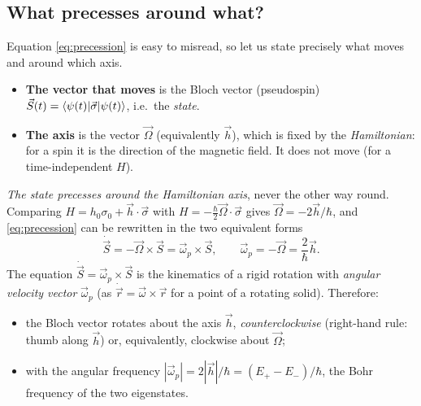 \subsection{What precesses around what?}\label{sec:precession}
Equation \eqref{eq:precession} is easy to misread, so let us state precisely what moves and around which axis.
\begin{itemize}
  \item \textbf{The vector that moves} is the Bloch vector (pseudospin) $\vec S(t)=\left\langle\psi(t)\middle|\vec\sigma\middle|\psi(t)\right\rangle$, i.e.\ the \emph{state}.
  \item \textbf{The axis} is the vector $\vec\Omega$ (equivalently $\vec h$), which is fixed by the \emph{Hamiltonian}: for a spin it is the direction of the
  magnetic field. It does not move (for a time-independent $H$).
\end{itemize}
\emph{The state precesses around the Hamiltonian axis}, never the other way round. Comparing $H=h_0\sigma_0+\vec h\cdot\vec\sigma$ with $H=-\frac\hbar2\vec\Omega\cdot\vec\sigma$
gives $\vec\Omega=-2\vec h/\hbar$, and \cref{eq:precession} can be rewritten in the two equivalent forms
\begin{equation}\label{eq:precession2}
  \dot{\vec S}=-\vec\Omega\times\vec S=\vec\omega_p\times\vec S,\qquad\vec\omega_p=-\vec\Omega=\frac2\hbar\vec h .
\end{equation}
The equation $\dot{\vec S}=\vec\omega_p\times\vec S$ is the kinematics of a rigid rotation with \emph{angular velocity vector} $\vec\omega_p$ (as $\dot{\vec r}=\vec\omega\times\vec r$
for a point of a rotating solid). Therefore:
\begin{itemize}
  \item the Bloch vector rotates about the axis $\vec h$, \emph{counterclockwise} (right-hand rule: thumb along $\vec h$) or, equivalently, clockwise about $\vec\Omega$;
  \item with the angular frequency $|\vec\omega_p|=2|\vec h|/\hbar=(E_+-E_-)/\hbar$, the Bohr frequency of the two eigenstates.
\end{itemize}

